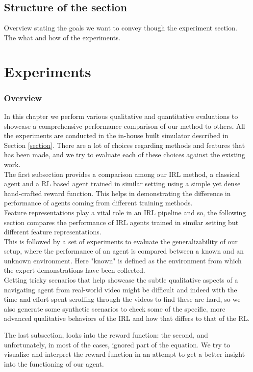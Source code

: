 \subsection{Structure of the section}
Overview stating the goals we want to convey though the experiment section. The what and how of the experiments.
\section*{Experiments}
\subsubsection*{Overview}
In this chapter we perform various qualitative and quantitative evaluations to showcase a comprehensive performance comparison of our method to others. All the experiments are conducted in the in-house built simulator described in Section \ref{section}. There are a lot of choices regarding methods and features that has been made, and we try to evaluate each of these choices against the existing work.\\
The first subsection provides a comparison among our IRL method, a classical agent and a RL based agent trained in similar setting using a simple yet dense hand-crafted reward function. This helps in demonstrating the difference in performance of agents coming from different training methods.\\
 Feature representations play a vital role in an IRL pipeline and so, the following section compares the performance of IRL agents trained in similar setting but different feature representations.\\
This is followed by a set of experiments to evaluate the generalizability of our setup, where the performance of an agent is compared between a known and an unknown environment. Here "known" is defined as the environment from which the expert demonstrations have been collected.\\

Getting tricky scenarios that help showcase the subtle qualitative aspects of a navigating agent from real-world video might be difficult and indeed with the time and effort spent scrolling through the videos to find these are hard, so we also generate some synthetic scenarios to check some of the specific, more advanced qualitative behaviors of the IRL and how that differs to that of the RL.

The last subsection, looks into the reward function: the second, and unfortunately, in most of the cases, ignored part of the equation. We try to visualize and interpret the reward function in an attempt to get a better insight into the functioning of our agent.

